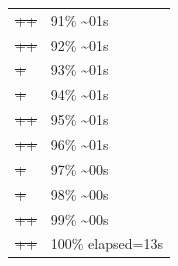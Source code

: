 \documentclass[12pt]{article}
\begin{document}
\begin{center}
\begin{tabular}{ll}
\sout{\sout{\sout{\sout{\sout{\sout{\sout{\sout{\sout{\sout{\sout{\sout{\sout{\sout{\sout{\sout{\sout{\sout{\sout{\sout{\sout{\sout{++}}}}}}}}}}}}}}}}}}}}}} & 91\% \textasciitilde{}01s\\
\sout{\sout{\sout{\sout{\sout{\sout{\sout{\sout{\sout{\sout{\sout{\sout{\sout{\sout{\sout{\sout{\sout{\sout{\sout{\sout{\sout{\sout{++}}}}}}}}}}}}}}}}}}}}}} & 92\% \textasciitilde{}01s\\
\sout{\sout{\sout{\sout{\sout{\sout{\sout{\sout{\sout{\sout{\sout{\sout{\sout{\sout{\sout{\sout{\sout{\sout{\sout{\sout{\sout{\sout{\sout{+}}}}}}}}}}}}}}}}}}}}}}} & 93\% \textasciitilde{}01s\\
\sout{\sout{\sout{\sout{\sout{\sout{\sout{\sout{\sout{\sout{\sout{\sout{\sout{\sout{\sout{\sout{\sout{\sout{\sout{\sout{\sout{\sout{\sout{+}}}}}}}}}}}}}}}}}}}}}}} & 94\% \textasciitilde{}01s\\
\sout{\sout{\sout{\sout{\sout{\sout{\sout{\sout{\sout{\sout{\sout{\sout{\sout{\sout{\sout{\sout{\sout{\sout{\sout{\sout{\sout{\sout{\sout{++}}}}}}}}}}}}}}}}}}}}}}} & 95\% \textasciitilde{}01s\\
\sout{\sout{\sout{\sout{\sout{\sout{\sout{\sout{\sout{\sout{\sout{\sout{\sout{\sout{\sout{\sout{\sout{\sout{\sout{\sout{\sout{\sout{\sout{++}}}}}}}}}}}}}}}}}}}}}}} & 96\% \textasciitilde{}01s\\
\sout{\sout{\sout{\sout{\sout{\sout{\sout{\sout{\sout{\sout{\sout{\sout{\sout{\sout{\sout{\sout{\sout{\sout{\sout{\sout{\sout{\sout{\sout{\sout{+}}}}}}}}}}}}}}}}}}}}}}}} & 97\% \textasciitilde{}00s\\
\sout{\sout{\sout{\sout{\sout{\sout{\sout{\sout{\sout{\sout{\sout{\sout{\sout{\sout{\sout{\sout{\sout{\sout{\sout{\sout{\sout{\sout{\sout{\sout{+}}}}}}}}}}}}}}}}}}}}}}}} & 98\% \textasciitilde{}00s\\
\sout{\sout{\sout{\sout{\sout{\sout{\sout{\sout{\sout{\sout{\sout{\sout{\sout{\sout{\sout{\sout{\sout{\sout{\sout{\sout{\sout{\sout{\sout{\sout{++}}}}}}}}}}}}}}}}}}}}}}}} & 99\% \textasciitilde{}00s\\
\sout{\sout{\sout{\sout{\sout{\sout{\sout{\sout{\sout{\sout{\sout{\sout{\sout{\sout{\sout{\sout{\sout{\sout{\sout{\sout{\sout{\sout{\sout{\sout{++}}}}}}}}}}}}}}}}}}}}}}}} & 100\% elapsed=13s\\
\end{tabular}
\end{center}
\begin{verbatim}

\end{verbatim}
\end{document}
